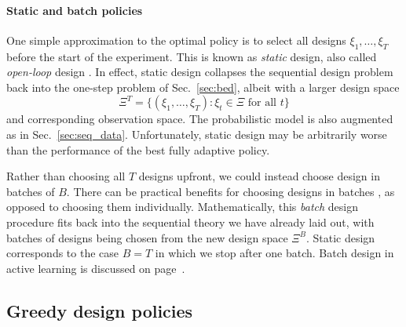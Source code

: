 \documentclass[a4paper, 10pt]{report}
\theoremstyle{plain}
\begin{document}
	\paragraph{Static and batch policies}
	One simple approximation to the optimal policy is to select all designs $\xi_1,\dots,\xi_T$ before the start of the experiment.
	This is known as \emph{static} design, also called \emph{open-loop} design \citep{distefano2014schaum}.
	In effect, static design collapses the sequential design problem back into the one-step problem of Sec.~\ref{sec:bed}, albeit with a larger design space 
	\begin{equation}
	\Xi^T = \{ (\xi_1,\dots,\xi_T):  \xi_t \in  \Xi \text{ for all } t \}
	\end{equation}
	and corresponding observation space.
	The probabilistic model is also augmented as in Sec.~\ref{sec:seq_data}.
	Unfortunately, static design may be arbitrarily worse than the performance of the best fully adaptive policy.
	
	Rather than choosing all $T$ designs upfront, we could instead choose design in batches of $B$.
	There can be practical benefits for choosing designs in batches \citep{lyu2019ultra}, as opposed to choosing them individually.
	Mathematically, this \emph{batch} design procedure fits back into the sequential theory we have already laid out, with batches of designs being chosen from the new design space $\Xi^B$.
	Static design corresponds to the case $B=T$ in which we stop after one batch.
	Batch design in active learning is discussed on page~\pageref{sec:batchbald}.
	
	
	
	
	\subsection{Greedy design policies}
	\label{sec:greedy}
	
\end{document}
